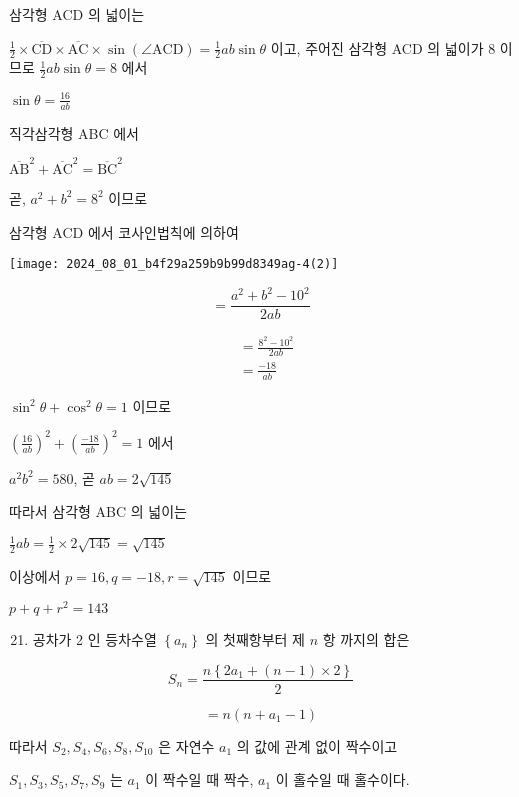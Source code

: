 \documentclass[10pt]{article}
\begin{document}
삼각형 ACD 의 넓이는

$\frac{1}{2} \times \overline{\mathrm{CD}} \times \overline{\mathrm{AC}} \times \sin (\angle \mathrm{ACD})=\frac{1}{2} a b \sin \theta$ 이고, 주어진 삼각형 ACD 의 넓이가 8 이므로 $\frac{1}{2} a b \sin \theta=8$ 에서

$\sin \theta=\frac{16}{a b}$

직각삼각형 ABC 에서

$\overline{\mathrm{AB}}^{2}+\overline{\mathrm{AC}}^{2}=\overline{\mathrm{BC}}^{2}$

곧, $a^{2}+b^{2}=8^{2}$ 이므로

삼각형 ACD 에서 코사인법칙에 의하여

\begin{center}
\texttt{[image: 2024\_08\_01\_b4f29a259b9b99d8349ag-4(2)]}
\end{center}

\[
=\frac{a^{2}+b^{2}-10^{2}}{2 a b}
\]

\[
\begin{aligned}
& =\frac{8^{2}-10^{2}}{2 a b} \\
& =\frac{-18}{a b}
\end{aligned}
\]

$\sin ^{2} \theta+\cos ^{2} \theta=1$ 이므로

$\left(\frac{16}{a b}\right)^{2}+\left(\frac{-18}{a b}\right)^{2}=1$ 에서

$a^{2} b^{2}=580$, 곧 $a b=2 \sqrt{145}$

따라서 삼각형 ABC 의 넓이는

$\frac{1}{2} a b=\frac{1}{2} \times 2 \sqrt{145}=\sqrt{145}$

이상에서 $p=16, q=-18, r=\sqrt{145}$ 이므로

$p+q+r^{2}=143$

\begin{enumerate}
  \setcounter{enumi}{20}
  \item 공차가 2 인 등차수열 $\left\{a_{n}\right\}$ 의 첫째항부터 제 $n$ 항 까지의 합은
\end{enumerate}

\[
S_{n}=\frac{n\left\{2 a_{1}+(n-1) \times 2\right\}}{2}
\]

\[
=n\left(n+a_{1}-1\right)
\]

따라서 $S_{2}, S_{4}, S_{6}, S_{8}, S_{10}$ 은 자연수 $a_{1}$ 의 값에 관계 없이 짝수이고

$S_{1}, S_{3}, S_{5}, S_{7}, S_{9}$ 는 $a_{1}$ 이 짝수일 때 짝수, $a_{1}$ 이 홀수일 때 홀수이다.
\end{document}
